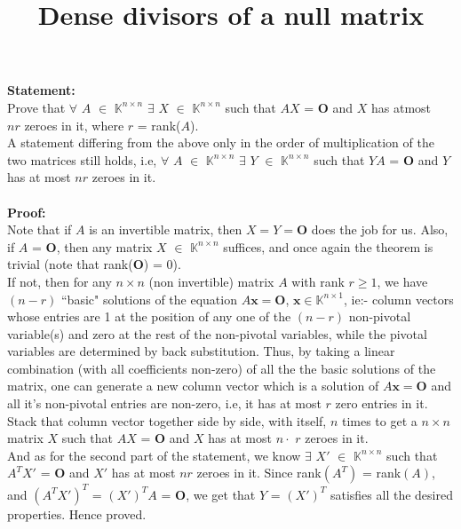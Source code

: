 \documentclass{article}
\title{\textbf{Dense divisors of a null matrix}}
\begin{document}
\maketitle
\noindent
{\bf Statement:}\\ 
Prove that $\forall$ $A$ $\in$ $\mathbb{K}^{n\times n}$ $\exists$ $X$ $\in$ $\mathbb{K}^{n\times n}$ such that $AX$ = $\textbf{O}$ and $X$ has atmost \\
$nr$ zeroes in it, where $r$ = rank($A$).\\
A statement differing from the above only in the order of multiplication of the two matrices still holds, i.e, $\forall$ $A$ $\in$ $\mathbb{K}^{n\times n}$ $\exists$ $Y$ $\in$ $\mathbb{K}^{n\times n}$ such that $YA$ = $\textbf{O}$ and $Y$ has at most $n r$ zeroes in it. \\ \\
\noindent
{\bf Proof:}\\ 
Note that if $A$ is an invertible matrix, then $X = Y = \textbf{O}$ does the job for us.
Also, if $A$ = $\textbf{O}$, then any matrix $X$ $\in$ $\mathbb{K}^{n\times n}$ suffices, and once again the theorem is trivial (note that rank($\textbf{O}$) = 0).\\
If not, then for any $n\times n$ (non invertible) matrix $A$ with rank $r \geq 1$, we have $(n - r)$ ``basic" solutions of the equation $A\textbf{x} = \textbf{O}$, $\textbf{x} \in \mathbb{K}^{n\times 1}$, ie:- column vectors whose entries are 1 at the position of any one of the $(n - r)$ non-pivotal variable(s) and zero at the rest of the non-pivotal variables, while the pivotal variables are determined by back substitution. Thus, by taking a linear combination (with all coefficients non-zero) of all the the basic solutions of the matrix, one can generate a new column vector which is a solution of $A\textbf{x} = \textbf{O}$ and all it's non-pivotal entries are non-zero, i.e, it has at most $r$ zero entries in it. Stack that column vector together side by side, with itself, $n$ times to get a $n\times n$ matrix $X$ such that $AX$ = $\textbf{O}$ and $X$ has at most $n\cdot$ $r$ zeroes in it.\\
And as for the second part of the statement, we know $\exists$ $X'$ $\in$ $\mathbb{K}^{n\times n}$ such that $A^{T}X'$ = $\textbf{O}$ and $X'$ has at most $n r$ zeroes in it. Since rank$(A^{T})$ = rank$(A)$, and $(A^{T}X')^{T}$ = $(X')^{T}A$ = $\textbf{O}$, we get that $Y$ = $(X')^{T}$ satisfies all the desired properties.
Hence proved.\\ \\
\noindent




\end{document}
